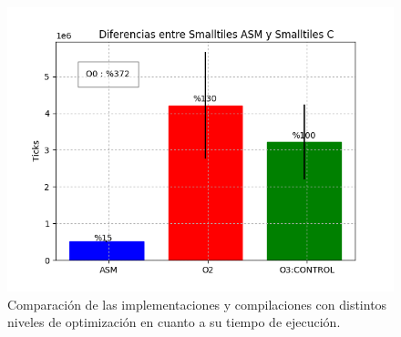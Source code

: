 \begin{figure}[h!]
\centering
\captionsetup{justification=centering}
\includegraphics[width = 15 cm, height = 10 cm]{imagenes/ASMvsCSmalltiles.png}
\caption[center]{Comparación de las implementaciones y compilaciones con distintos niveles de optimización en cuanto a su tiempo de ejecución.}
\end{figure}
